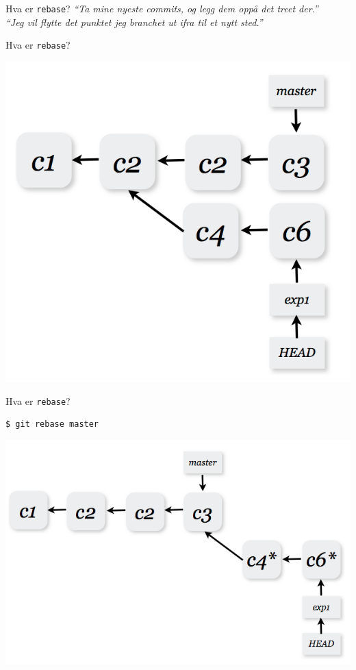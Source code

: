 \documentclass{beamer}
\begin{document}
\begin{frame}{Hva er \texttt{rebase}?}
    \emph{``Ta mine nyeste commits, og legg dem oppå det treet der.''}\\
    \pause
    \bigskip
    \emph{``Jeg vil flytte det punktet jeg branchet ut ifra til et nytt sted.''}
\end{frame}

\begin{frame}{Hva er \texttt{rebase}?}
    \begin{center}
        \includegraphics[scale=0.3]{3.png}
    \end{center}
\end{frame}

\begin{frame}[fragile]{Hva er \texttt{rebase}?}
    \begin{lstlisting}[language=bash]
      $ git rebase master
    \end{lstlisting}
    \pause
    \begin{center}
        \includegraphics[scale=0.3]{4.png}\\
    \end{center}
\end{frame}
\end{document}
